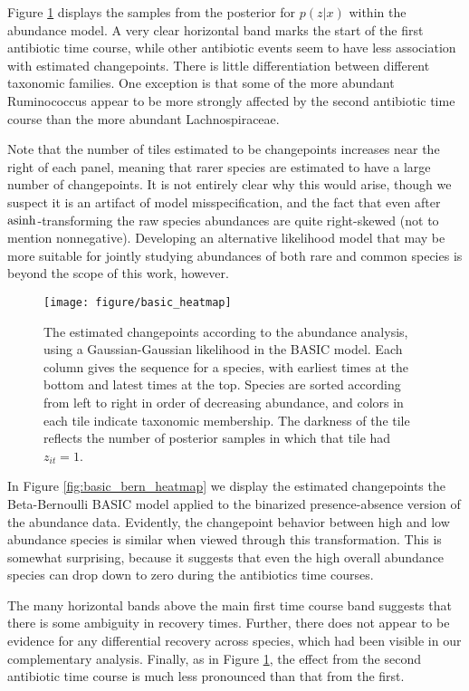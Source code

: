\documentclass[14pt]{extarticle}
\begin{document}
Figure \ref{fig:basic_heatmap} displays the samples from the posterior for
$p\left(z \vert x\right)$ within the abundance model. A very clear horizontal
band marks the start of the first antibiotic time course, while other antibiotic
events seem to have less association with estimated changepoints. There is
little differentiation between different taxonomic families. One exception is
that some of the more abundant Ruminococcus appear to be more strongly affected
by the second antibiotic time course than the more abundant Lachnospiraceae.

Note that the number of tiles estimated to be changepoints increases near the
right of each panel, meaning that rarer species are estimated to have a large
number of changepoints. It is not entirely clear why this would arise, though we
suspect it is an artifact of model misspecification, and the fact that even
after $\mathop\mathrm{asinh}$-transforming the raw species abundances are quite right-skewed
(not to mention nonnegative). Developing an alternative likelihood model that
may be more suitable for jointly studying abundances of both rare and common
species is beyond the scope of this work, however.

\begin{figure}
  \centering
  \texttt{[image: figure/basic\_heatmap]}
  \caption{The estimated changepoints according to the abundance analysis, using
    a Gaussian-Gaussian likelihood in the BASIC model. Each column gives the
    sequence for a species, with earliest times at the bottom and latest times
    at the top. Species are sorted according from left to right in order of
    decreasing abundance, and colors in each tile indicate taxonomic membership.
    The darkness of the tile reflects the number of posterior samples in which
    that tile had $z_{it} = 1$.
    \label{fig:basic_heatmap} }
\end{figure}

In Figure \ref{fig:basic_bern_heatmap} we display the estimated changepoints the
Beta-Bernoulli BASIC model applied to the binarized presence-absence version of
the abundance data. Evidently, the changepoint behavior between high and low
abundance species is similar when viewed through this transformation. This is
somewhat surprising, because it suggests that even the high overall abundance
species can drop down to zero during the antibiotics time courses.

The many horizontal bands above the main first time course band suggests that
there is some ambiguity in recovery times. Further, there does not appear to be
evidence for any differential recovery across species, which had been visible in
our complementary analysis. Finally, as in Figure \ref{fig:basic_heatmap}, the
effect from the second antibiotic time course is much less pronounced than that
from the first.
\end{document}
